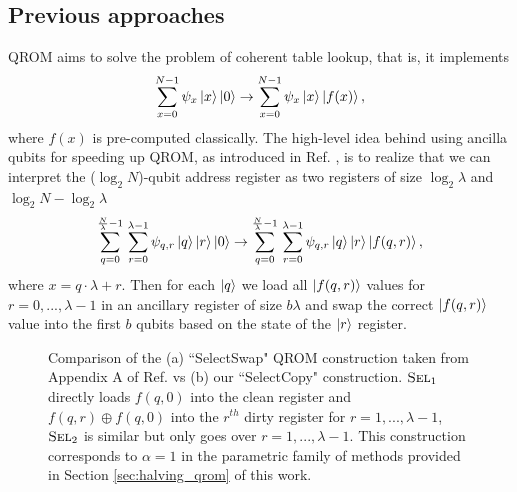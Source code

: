 \documentclass[a4paper, amsfonts, amssymb, amsmath, reprint, showkeys, twoside,superscriptaddress, onecolumn, nofootinbib]{revtex4-2}
\begin{document}
\subsection{Previous approaches}
QROM aims to solve the problem of coherent table lookup, that is, it implements
\begin{equation} \label{eq:data_load}
    \sum_{x=0}^{N-1} \psi_x \ket{x}\ket{0} \to  \sum_{x=0}^{N-1} \psi_x \ket{x} \ket{f(x)},
\end{equation}
where $f(x)$ is pre-computed classically. The high-level idea behind using ancilla qubits for speeding up QROM, as introduced in Ref. \cite{low2024trading}, is to realize that we can interpret the ($\log_2 N$)-qubit address register as two registers of size $\log_2 \lambda$ and $\log_2 N - \log_2 \lambda$
\begin{equation} \label{eq:data_load_2}
    \sum_{q=0}^{\frac{N}{\lambda}-1} \,\sum_{r=0}^{\lambda-1} \psi_{q,r} \ket{q}\ket{r}\ket{0} \to  \sum_{q=0}^{\frac{N}{\lambda}-1} \,\sum_{r=0}^{\lambda-1} \psi_{q,r} \ket{q}\ket{r}\ket{f(q,r)},
\end{equation}
where $x = q\cdot \lambda + r$. Then for each $\ket{q}$ we load all $\ket{f(q,r)}$ values for $r=0,...,\lambda -1$ in an ancillary register of size $b\lambda$ and swap the correct $\ket{f(q,r)}$ value into the first $b$ qubits based on the state of the $\ket{r}$ register.\\
\begin{figure}[t!]
    \centering


    


    \caption{Comparison of the (a) ``SelectSwap" QROM construction taken from Appendix A of Ref. \cite{berry2019qubitization} vs (b) our ``SelectCopy" construction. $\textsc{Sel}_1$ directly loads $f(q,0)$ into the clean register and $f(q,r) \oplus f(q,0)$ into the $r^{th}$ dirty register for $r=1,...,\lambda -1$, $\textsc{Sel}_2$ is similar but only goes over $r=1,...,\lambda -1$. This construction corresponds to $\alpha = 1$ in the parametric family of methods provided in Section \ref{sec:halving_qrom} of this work.}
    \label{fig:qrom_comparison_circ}
\end{figure}
\end{document}
